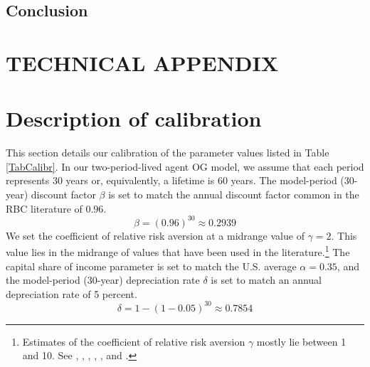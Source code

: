 \documentclass[letterpaper,12pt]{article}
\theoremstyle{definition}
\begin{document}
\begin{spacing}{1.5}


\section{Conclusion}\label{SecConclusion}


\end{spacing}




\newpage
\renewcommand{\theequation}{T.\arabic{section}.\arabic{equation}}
\renewcommand{\thesection}{T-\arabic{section}}   %

\setcounter{equation}{0}                         %
\setcounter{section}{0}                          %
\section*{TECHNICAL APPENDIX}

\setcounter{equation}{0}                         %
\section{Description of calibration}\label{SecTAppCalib}

  This section details our calibration of the parameter values listed in Table \ref{TabCalibr}. In our two-period-lived agent OG model, we assume that each period represents 30 years or, equivalently, a lifetime is 60 years. The model-period (30-year) discount factor $\beta$ is set to match the annual discount factor common in the RBC literature of $0.96$.
  \begin{equation}\label{EqTAppCalib_beta}
    \beta = (0.96)^{30}\approx 0.2939
  \end{equation}
  We set the coefficient of relative risk aversion at a midrange value of $\gamma=2$. This value lies in the midrange of values that have been used in the literature.\footnote{Estimates of the coefficient of relative risk aversion $\gamma$ mostly lie between 1 and 10. See \citet{MankiwZeldes:1991}, \citet{Blake:1996}, \citet{Campbell:1996}, \citet{Kocherlakota:1996}, \citet{BravConstantinidesGeczy:2002}, and \citet{MehraPrescott:1985}.} The capital share of income parameter is set to match the U.S. average $\alpha=0.35$, and the model-period (30-year) depreciation rate $\delta$ is set to match an annual depreciation rate of 5 percent.
  \begin{equation}\label{EqTAppCalib_delta}
    \delta = 1 - (1 - 0.05)^{30}\approx 0.7854
  \end{equation}
\end{document}
